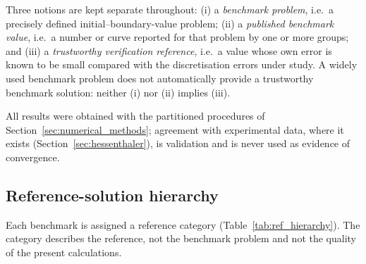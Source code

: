 Three notions are kept separate throughout:
(i) a \emph{benchmark problem}, i.e.\ a precisely defined initial--boundary-value problem;
(ii) a \emph{published benchmark value}, i.e.\ a number or curve reported for that problem by one or more groups; and
(iii) a \emph{trustworthy verification reference}, i.e.\ a value whose own error is known to be small compared with the discretisation errors under study.
A widely used benchmark problem does not automatically provide a trustworthy benchmark solution: neither (i) nor (ii) implies (iii).

All results were obtained with the partitioned procedures of Section~\ref{sec:numerical_methods}; agreement with experimental data, where it exists (Section~\ref{sec:hessenthaler}), is validation and is never used as evidence of convergence.

\subsection{Reference-solution hierarchy}\label{sec:ref_hierarchy}

Each benchmark is assigned a reference category (Table~\ref{tab:ref_hierarchy}).
The category describes the reference, not the benchmark problem and not the quality of the present calculations.

